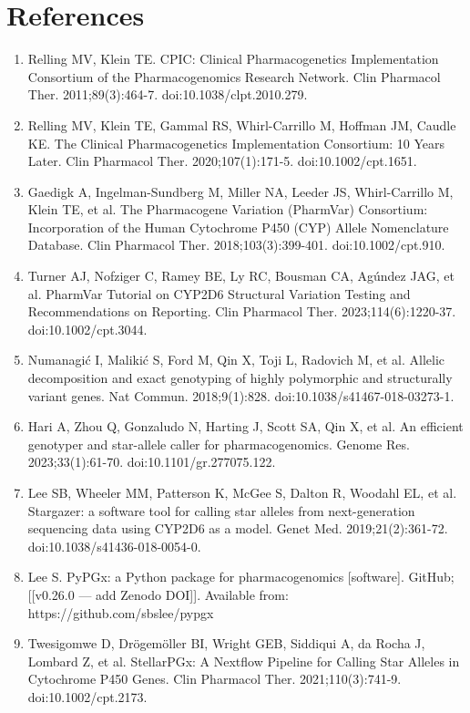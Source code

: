 \documentclass[11pt]{article}
\begin{document}
\section*{References}

\begin{enumerate}
\item Relling MV, Klein TE. CPIC: Clinical Pharmacogenetics Implementation Consortium of the Pharmacogenomics Research Network. Clin Pharmacol Ther. 2011;89(3):464-7. doi:10.1038/clpt.2010.279.
\item Relling MV, Klein TE, Gammal RS, Whirl-Carrillo M, Hoffman JM, Caudle KE. The Clinical Pharmacogenetics Implementation Consortium: 10 Years Later. Clin Pharmacol Ther. 2020;107(1):171-5. doi:10.1002/cpt.1651.
\item Gaedigk A, Ingelman-Sundberg M, Miller NA, Leeder JS, Whirl-Carrillo M, Klein TE, et al. The Pharmacogene Variation (PharmVar) Consortium: Incorporation of the Human Cytochrome P450 (CYP) Allele Nomenclature Database. Clin Pharmacol Ther. 2018;103(3):399-401. doi:10.1002/cpt.910.
\item Turner AJ, Nofziger C, Ramey BE, Ly RC, Bousman CA, Agúndez JAG, et al. PharmVar Tutorial on CYP2D6 Structural Variation Testing and Recommendations on Reporting. Clin Pharmacol Ther. 2023;114(6):1220-37. doi:10.1002/cpt.3044.
\item Numanagić I, Malikić S, Ford M, Qin X, Toji L, Radovich M, et al. Allelic decomposition and exact genotyping of highly polymorphic and structurally variant genes. Nat Commun. 2018;9(1):828. doi:10.1038/s41467-018-03273-1.
\item Hari A, Zhou Q, Gonzaludo N, Harting J, Scott SA, Qin X, et al. An efficient genotyper and star-allele caller for pharmacogenomics. Genome Res. 2023;33(1):61-70. doi:10.1101/gr.277075.122.
\item Lee SB, Wheeler MM, Patterson K, McGee S, Dalton R, Woodahl EL, et al. Stargazer: a software tool for calling star alleles from next-generation sequencing data using CYP2D6 as a model. Genet Med. 2019;21(2):361-72. doi:10.1038/s41436-018-0054-0.
\item Lee S. PyPGx: a Python package for pharmacogenomics [software]. GitHub; [[v0.26.0 --- add Zenodo DOI]]. Available from: https://github.com/sbslee/pypgx
\item Twesigomwe D, Drögemöller BI, Wright GEB, Siddiqui A, da Rocha J, Lombard Z, et al. StellarPGx: A Nextflow Pipeline for Calling Star Alleles in Cytochrome P450 Genes. Clin Pharmacol Ther. 2021;110(3):741-9. doi:10.1002/cpt.2173.

\end{enumerate}
\end{document}
